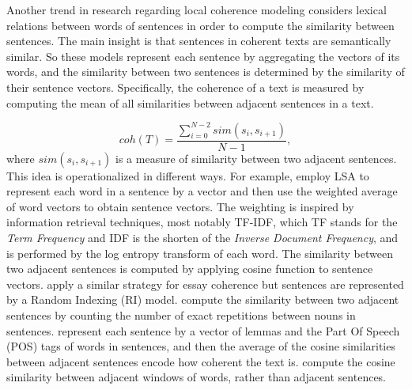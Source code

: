 Another trend in research regarding local coherence modeling considers lexical relations between words of sentences in order to compute the similarity between sentences.    
The main insight is that sentences in coherent texts are semantically similar. 
So these models represent each sentence by aggregating the vectors of its words, and the similarity between two sentences is determined by the similarity of their sentence vectors. 
Specifically, the coherence of a text is measured by computing the mean of all similarities between adjacent sentences in a text. 

\begin{equation}
coh(T) = \frac{\sum_{i=0}^{N-2}sim(s_i,s_{i+1})}{N-1},
\end{equation} 
%
where $sim(s_i, s_{i+1})$ is a measure of similarity between two adjacent sentences. 
This idea is operationalized in different ways.
For example,  employ LSA to represent each word in a sentence by a vector and then use the weighted average of word vectors to obtain sentence vectors. 
The weighting is inspired by information retrieval techniques, most notably TF-IDF, which TF stands for the \emph{Term Frequency} and IDF is the shorten of the \emph{Inverse Document Frequency}, and is performed by the log entropy transform of each word. 
The similarity between two adjacent sentences is computed by applying cosine function to sentence vectors. 
 apply a similar strategy for essay coherence but sentences are represented by a Random Indexing (RI) model. 
 compute the similarity between two adjacent sentences by counting the number of exact repetitions between nouns in sentences. 
 represent each sentence by a vector of lemmas and the Part Of Speech (POS) tags of words in sentences, and then the average of the cosine similarities between adjacent sentences encode how coherent the text is. 
 compute the cosine similarity between adjacent windows of words, rather than adjacent sentences. 

